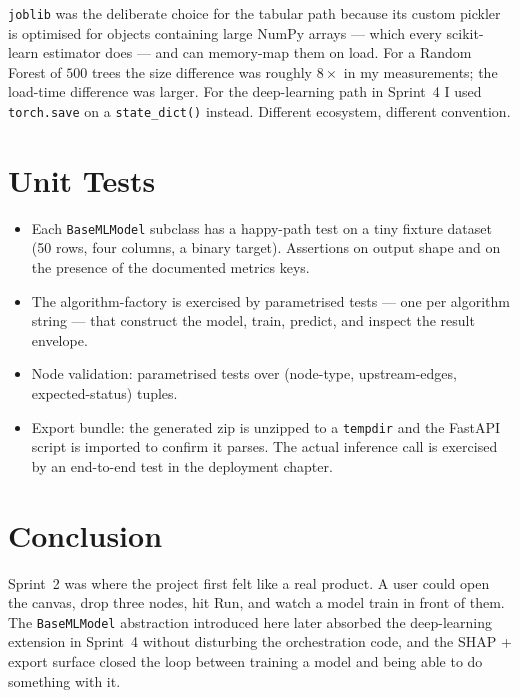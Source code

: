 \documentclass[12pt, a4paper]{report}
\begin{document}
\texttt{joblib} was the deliberate choice for the tabular path
because its custom pickler is optimised for objects containing large
NumPy arrays --- which every scikit-learn estimator does --- and can
memory-map them on load. For a Random Forest of $500$ trees the size
difference was roughly $8\times$ in my measurements; the load-time
difference was larger. For the deep-learning path in Sprint~4 I
used \texttt{torch.save} on a \texttt{state\_dict()} instead.
Different ecosystem, different convention.

\section{Unit Tests}

\begin{itemize}
    \item Each \texttt{BaseMLModel} subclass has a happy-path test on
        a tiny fixture dataset (50 rows, four columns, a binary
        target). Assertions on output shape and on the presence of
        the documented metrics keys.
    \item The algorithm-factory is exercised by parametrised tests
        --- one per algorithm string --- that construct the model,
        train, predict, and inspect the result envelope.
    \item Node validation: parametrised tests over
        (node-type, upstream-edges, expected-status) tuples.
    \item Export bundle: the generated zip is unzipped to a
        \texttt{tempdir} and the FastAPI script is imported to
        confirm it parses. The actual inference call is exercised
        by an end-to-end test in the deployment chapter.
\end{itemize}

\section*{Conclusion}

Sprint~2 was where the project first felt like a real product. A
user could open the canvas, drop three nodes, hit Run, and watch a
model train in front of them. The \texttt{BaseMLModel} abstraction
introduced here later absorbed the deep-learning extension in
Sprint~4 without disturbing the orchestration code, and the SHAP
+ export surface closed the loop between training a model and being
able to do something with it.

\end{document}
